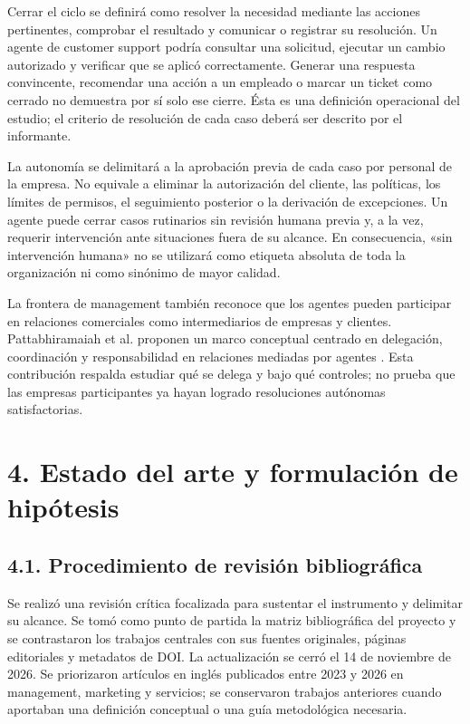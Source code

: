 \documentclass[12pt,letterpaper]{article}
\begin{document}
Cerrar el ciclo se definirá como resolver la necesidad mediante las acciones pertinentes, comprobar el resultado y comunicar o registrar su resolución. Un agente de customer support podría consultar una solicitud, ejecutar un cambio autorizado y verificar que se aplicó correctamente. Generar una respuesta convincente, recomendar una acción a un empleado o marcar un ticket como cerrado no demuestra por sí solo ese cierre. Ésta es una definición operacional del estudio; el criterio de resolución de cada caso deberá ser descrito por el informante.

La autonomía se delimitará a la aprobación previa de cada caso por personal de la empresa. No equivale a eliminar la autorización del cliente, las políticas, los límites de permisos, el seguimiento posterior o la derivación de excepciones. Un agente puede cerrar casos rutinarios sin revisión humana previa y, a la vez, requerir intervención ante situaciones fuera de su alcance. En consecuencia, «sin intervención humana» no se utilizará como etiqueta absoluta de toda la organización ni como sinónimo de mayor calidad.

La frontera de management también reconoce que los agentes pueden participar en relaciones comerciales como intermediarios de empresas y clientes. Pattabhiramaiah et al. proponen un marco conceptual centrado en delegación, coordinación y responsabilidad en relaciones mediadas por agentes \citep{agentmarketing}. Esta contribución respalda estudiar qué se delega y bajo qué controles; no prueba que las empresas participantes ya hayan logrado resoluciones autónomas satisfactorias.

\section*{4. Estado del arte y formulación de hipótesis}
\subsection*{4.1. Procedimiento de revisión bibliográfica}
Se realizó una revisión crítica focalizada para sustentar el instrumento y delimitar su alcance. Se tomó como punto de partida la matriz bibliográfica del proyecto y se contrastaron los trabajos centrales con sus fuentes originales, páginas editoriales y metadatos de DOI. La actualización se cerró el 14 de noviembre de 2026. Se priorizaron artículos en inglés publicados entre 2023 y 2026 en management, marketing y servicios; se conservaron trabajos anteriores cuando aportaban una definición conceptual o una guía metodológica necesaria.
\end{document}

